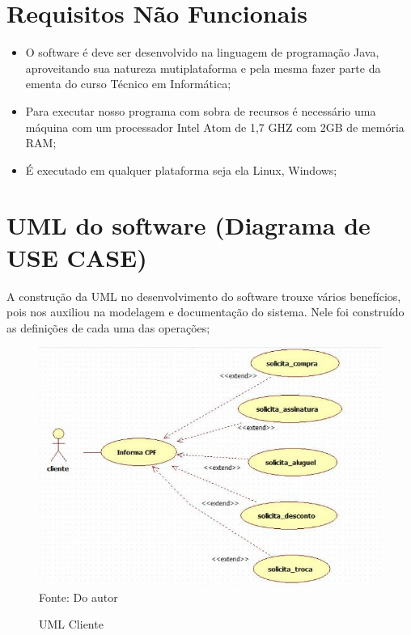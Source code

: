 \section{Requisitos Não Funcionais}

\begin{itemize}

\item O software é deve ser desenvolvido na linguagem de programação Java, aproveitando sua natureza mutiplataforma e pela mesma fazer parte da ementa do curso Técnico em Informática;

\item Para executar nosso programa com sobra de recursos é necessário uma máquina com um processador Intel Atom de 1,7 GHZ com 2GB de memória RAM;

\item É executado em qualquer plataforma seja ela Linux, Windows;
\end{itemize}

\section {UML do software (Diagrama de USE CASE)}

	A construção da UML no desenvolvimento do software trouxe vários benefícios, pois nos auxiliou na modelagem e documentação do sistema. Nele foi construído as definições de cada uma das operações;


\begin{figure}
	\centering 
	\caption{UML Cliente}
	
	\label{uml_cliente}
	\includegraphics[scale = 0.45]{imagens/uml-cliente.jpg}
	\\Fonte: Do autor
\end{figure}